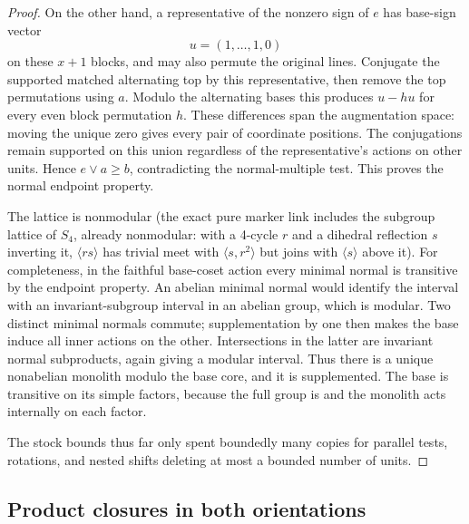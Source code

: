 \begin{proof}
On the other hand, a representative of the nonzero sign of \(e\)
has base-sign vector
\[
 u=(1,\ldots,1,0)
\]
on these \(x+1\) blocks, and may also permute the original lines.
Conjugate the supported matched alternating top by this representative,
then remove the top permutations using \(a\).  Modulo the alternating
bases this produces \(u-hu\) for every even block permutation \(h\).
These differences span the augmentation space: moving the unique zero
gives every pair of coordinate positions.  The conjugations remain
supported on this union regardless of the representative's actions
on other units.  Hence \(e\vee a\ge b\), contradicting the
normal-multiple test.  This proves the normal endpoint property.

The lattice is nonmodular (the exact pure marker link includes the subgroup lattice of \(S_4\),
already nonmodular: with a 4-cycle \(r\) and a dihedral reflection \(s\) inverting it, \(\langle r
s\rangle\) has trivial meet with \(\langle s,r^2\rangle\) but joins with \(\langle s\rangle\)
above it). For completeness, in the faithful base-coset action every minimal normal is
transitive by the endpoint property.  An abelian minimal normal would identify
the interval with an invariant-subgroup interval in an abelian group, which
is modular.  Two distinct minimal normals commute; supplementation by one
then makes the base induce all inner actions on the other.  Intersections
in the latter are invariant normal subproducts, again giving a modular
interval.  Thus there is a unique nonabelian monolith modulo the base core,
and it is supplemented.  The base is transitive on its simple factors,
because the full group is and the monolith acts internally on each factor.

The stock bounds thus far only spent boundedly many copies for parallel tests, rotations, and
nested shifts deleting at most a bounded number of units.
\end{proof}

\subsection{Product closures in both orientations}

